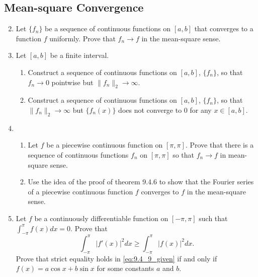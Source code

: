 \documentclass{article}
\begin{document}
\subsection{Mean-square Convergence}

\begin{enumerate}
      \setcounter{enumi}{1}
      \item Let $\{f_n\}$ be a sequence of continuous functions on $[a,b]$ that
            converges to a function $f$ uniformly. Prove that $f_n\to f$ in the
            mean-square sense.
      \item Let $[a,b]$ be a finite interval.
            \begin{enumerate}
                  \item Construct a sequence of continuous functions on $[a,b]$,
                        $\{f_n\}$, so that $f_n\to 0$ pointwise but
                        $\lVert f_n\rVert_2\to\infty$.
                  \item Construct a sequence of continuous functions on $[a,b]$,
                        $\{f_n\}$, so that $\lVert f_n\rVert_2\to\infty$ but
                        $\{f_n(x)\}$ does not converge to 0 for any $x\in[a,b]$.
            \end{enumerate}
            \setcounter{enumi}{5}
      \item \begin{enumerate}
                  \item Let $f$ be a piecewise continuous function on $[\pi,\pi]$.
                        Prove that there is a sequence of continuous functions
                        $f_n$ on $[\pi,\pi]$ so that $f_n\to f$ in mean-square sense.
                  \item Use the idea of the proof of theorem 9.4.6 to show that
                        the Fourier series of a piecewise continuous function $f$
                        converges to $f$ in the mean-square sense.
            \end{enumerate}
            \setcounter{enumi}{8}
      \item Let $f$ be a continuously differentiable function on $[-\pi,\pi]$
            such that \\$\int_{-\pi}^\pi f(x)dx=0$. Prove that
                  \begin{equation}
                        \int_{-\pi}^\pi \lvert f'(x)\rvert^2dx
                        \geq \int_{-\pi}^\pi \lvert f(x)\rvert^2dx.
                        \label{eq:9.4_9_given}
                  \end{equation}
                  Prove that strict equality holds in \eqref{eq:9.4_9_given} if and
                  only if $f(x)=a\cos x+b\sin x$ for some constants $a$ and $b$.
\end{enumerate}
\end{document}

